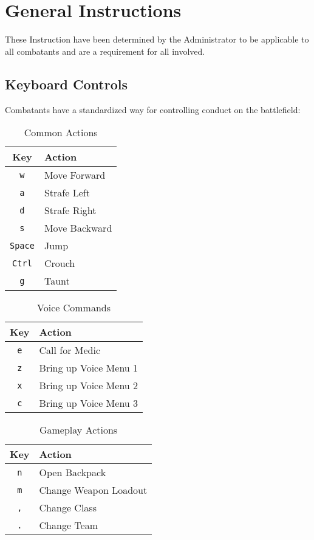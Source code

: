 \section{General Instructions}
\label{general_instructions}

These Instruction have been determined by the Administrator to be applicable to all combatants and are a requirement for all involved. 

\subsection{Keyboard Controls}
Combatants have a standardized way for controlling conduct on the battlefield:

\begin{table}[h!b!p!]
\caption{Common Actions}
\begin{center}
\begin{tabular}{|c|l|}
	\hline
		Key & Action\\
	\hline
	\texttt{w}&Move Forward\\
	\texttt{a}&Strafe Left\\
	\texttt{d}&Strafe Right\\
	\texttt{s}&Move Backward\\
	\texttt{Space}&Jump\\
	\texttt{Ctrl}&Crouch\\
	\texttt{g}&Taunt\\
  	\hline
\end{tabular}
\end{center}
\label{table_common_actions}
\end{table}

\begin{table}[h!b!p!]
\caption{Voice Commands}
\begin{center}
\begin{tabular}{|c|l|}
	\hline
		Key & Action\\
	\hline
	\texttt{e}&Call for Medic\\
	\texttt{z}&Bring up Voice Menu 1\\
	\texttt{x}&Bring up Voice Menu 2\\
	\texttt{c}&Bring up Voice Menu 3\\
  	\hline
\end{tabular}
\end{center}
\label{table_voice_commands}
\end{table}

\begin{table}[h!b!p!]
\caption{Gameplay Actions}
\begin{center}
\begin{tabular}{|c|l|}
	\hline
		Key & Action\\
	\hline
	\texttt{n}&Open Backpack\\
	\texttt{m}&Change Weapon Loadout\\
	\texttt{,}&Change Class\\
	\texttt{.}&Change Team\\
  	\hline
\end{tabular}
\end{center}
\label{table_gameplay_actions}
\end{table}

